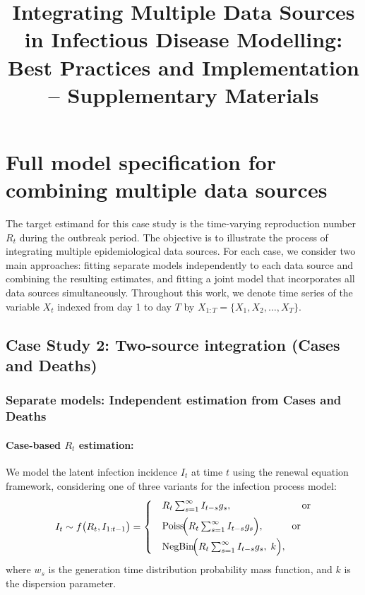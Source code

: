 \documentclass{article}
\title{Integrating Multiple Data Sources in Infectious Disease Modelling: Best Practices and Implementation -- Supplementary Materials}
\author{}
\date{}
\newcommand{\beginsupplement}{%
        \setcounter{section}{0}
        \renewcommand{\thesection}{S\arabic{section}}%
        \setcounter{table}{0}
        \renewcommand{\thetable}{S\arabic{table}}%
        \setcounter{figure}{0}
        \renewcommand{\thefigure}{S\arabic{figure}}%
     }
\begin{document}
\maketitle

\beginsupplement

\section{Full model specification for combining multiple data sources}
The target estimand for this case study is the time-varying reproduction number $R_t$ during the outbreak period. The objective is to illustrate the process of integrating multiple epidemiological data sources. For each case, we consider two main approaches: fitting separate models independently to each data source and combining the resulting estimates, and fitting a joint model that incorporates all data sources simultaneously. Throughout this work, we denote time series of the variable $X_t$ indexed from day 1 to day $T$ by $X_{1:T} = \{X_1, X_2, \ldots, X_T\}$.


\subsection{Case Study 2: Two-source integration (Cases and Deaths)}

\subsubsection{Separate models: Independent estimation from Cases and Deaths}

\paragraph{Case-based $R_{t}$ estimation:}
We model the latent infection incidence $I_{t}$ at time $t$ using the renewal equation framework, considering one of three variants for the infection process model:
\begin{align}\label{latent_inf}
I_t \sim f\big(R_t, I_{1:t-1}\big) =
\begin{cases} 
 & R_t \sum_{s=1}^\infty I_{t-s}g_s, \hspace{2.5cm}\text{or}\\[5pt]
 & \mathrm{Poiss}\!\Big(R_t \sum_{s=1}^\infty I_{t-s}g_s\Big), \hspace{1cm}\text{or}\\[5pt]
 & \mathrm{NegBin}\!\Big(R_t \sum_{s=1}^\infty I_{t-s}g_s,\; k\Big),
\end{cases}
\end{align}
where $w_s$ is the generation time distribution probability mass function, and $k$ is the dispersion parameter.
\end{document}
